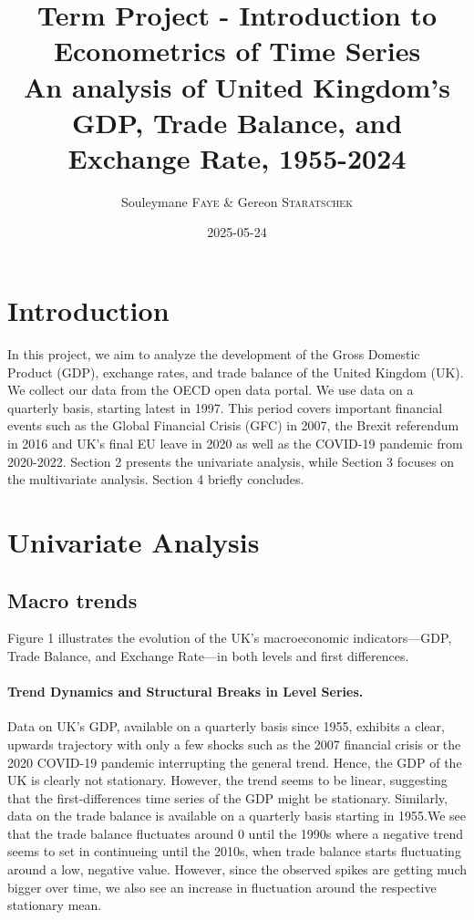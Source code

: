 \documentclass[
]{article}
\title{Term Project - Introduction to Econometrics of Time Series \\[1.5ex] 
	{\Large An analysis of United Kingdom's GDP, Trade Balance, and Exchange Rate, 1955-2024}}
\author{Souleymane \textsc{Faye} \& Gereon \textsc{Staratschek}}
\date{2025-05-24}
\begin{document}
	\maketitle
	
	\section{Introduction}
	
	In this project, we aim to analyze the development of the Gross Domestic
	Product (GDP), exchange rates, and trade balance of the United Kingdom
	(UK). We collect our data from the OECD open data portal. We use data on
	a quarterly basis, starting latest in 1997. This period covers important
	financial events such as the Global Financial Crisis (GFC) in 2007, the
	Brexit referendum in 2016 and UK's final EU leave in 2020 as well as the
	COVID-19 pandemic from 2020-2022. Section 2 presents the univariate analysis,
	while Section 3 focuses on the multivariate analysis. Section 4 briefly concludes.
	
	\section{Univariate Analysis}
	
	\subsection{Macro trends}
	
	Figure 1 illustrates the evolution of the UK’s macroeconomic indicators—GDP, Trade Balance, 
	and Exchange Rate—in both levels and first differences.
	
	\paragraph*{Trend Dynamics and Structural Breaks in Level Series.} 
	Data on UK's GDP, available on a quarterly basis
	since 1955, exhibits a clear, upwards trajectory with only a few
	shocks such as the 2007 financial crisis or the 2020 COVID-19 pandemic 
	interrupting the general trend. Hence, the GDP of the UK is clearly not
	stationary. However, the trend seems to be linear, suggesting that the
	first-differences time series of the GDP might be stationary. Similarly, data on 
	the trade balance is available on a quarterly basis starting in 1955.We see that 
	the trade balance fluctuates around 0 until the 1990s where a negative trend seems to set
	in continueing until the 2010s, when trade balance starts fluctuating
	around a low, negative value. However, since the observed spikes are
	getting much bigger over time, we also see an increase in fluctuation
	around the respective stationary mean.
	
\end{document}
